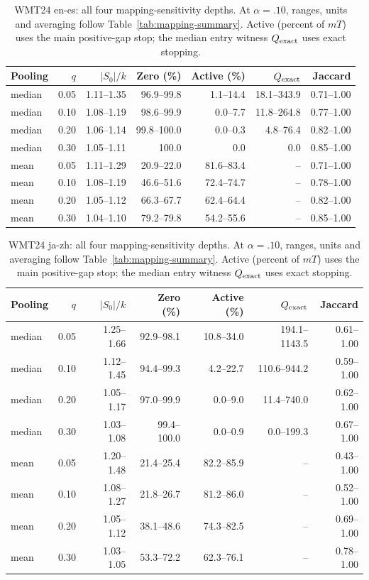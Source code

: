 \begin{table}[t]
\centering\small
\begin{tabular}{lrrrrrr}
\toprule
Pooling & $q$ & $|S_0|/k$ & Zero (\%) & Active (\%) & $Q_{\rm exact}$ & Jaccard \\
\midrule
median & 0.05 & 1.11--1.35 & 96.9--99.8 & 1.1--14.4 & 18.1--343.9 & 0.71--1.00 \\
median & 0.10 & 1.08--1.19 & 98.6--99.9 & 0.0--7.7 & 11.8--264.8 & 0.77--1.00 \\
median & 0.20 & 1.06--1.14 & 99.8--100.0 & 0.0--0.3 & 4.8--76.4 & 0.82--1.00 \\
median & 0.30 & 1.05--1.11 & 100.0 & 0.0 & 0.0 & 0.85--1.00 \\
mean & 0.05 & 1.11--1.29 & 20.9--22.0 & 81.6--83.4 & -- & 0.71--1.00 \\
mean & 0.10 & 1.08--1.19 & 46.6--51.6 & 72.4--74.7 & -- & 0.78--1.00 \\
mean & 0.20 & 1.05--1.12 & 66.3--67.7 & 62.4--64.4 & -- & 0.82--1.00 \\
mean & 0.30 & 1.04--1.10 & 79.2--79.8 & 54.2--55.6 & -- & 0.85--1.00 \\
\bottomrule
\end{tabular}
\caption{WMT24 en-es: all four mapping-sensitivity depths. At $\alpha=.10$, ranges, units and averaging follow Table~\ref{tab:mapping-summary}. Active (percent of $mT$) uses the main positive-gap stop; the median entry witness $Q_{\rm exact}$ uses exact stopping.}
\label{tab:mapping-all-4}
\end{table}

\begin{table}[t]
\centering\small
\begin{tabular}{lrrrrrr}
\toprule
Pooling & $q$ & $|S_0|/k$ & Zero (\%) & Active (\%) & $Q_{\rm exact}$ & Jaccard \\
\midrule
median & 0.05 & 1.25--1.66 & 92.9--98.1 & 10.8--34.0 & 194.1--1143.5 & 0.61--1.00 \\
median & 0.10 & 1.12--1.45 & 94.4--99.3 & 4.2--22.7 & 110.6--944.2 & 0.59--1.00 \\
median & 0.20 & 1.05--1.17 & 97.0--99.9 & 0.0--9.0 & 11.4--740.0 & 0.62--1.00 \\
median & 0.30 & 1.03--1.08 & 99.4--100.0 & 0.0--0.9 & 0.0--199.3 & 0.67--1.00 \\
mean & 0.05 & 1.20--1.48 & 21.4--25.4 & 82.2--85.9 & -- & 0.43--1.00 \\
mean & 0.10 & 1.08--1.27 & 21.8--26.7 & 81.2--86.0 & -- & 0.52--1.00 \\
mean & 0.20 & 1.05--1.12 & 38.1--48.6 & 74.3--82.5 & -- & 0.69--1.00 \\
mean & 0.30 & 1.03--1.05 & 53.3--72.2 & 62.3--76.1 & -- & 0.78--1.00 \\
\bottomrule
\end{tabular}
\caption{WMT24 ja-zh: all four mapping-sensitivity depths. At $\alpha=.10$, ranges, units and averaging follow Table~\ref{tab:mapping-summary}. Active (percent of $mT$) uses the main positive-gap stop; the median entry witness $Q_{\rm exact}$ uses exact stopping.}
\label{tab:mapping-all-5}
\end{table}
